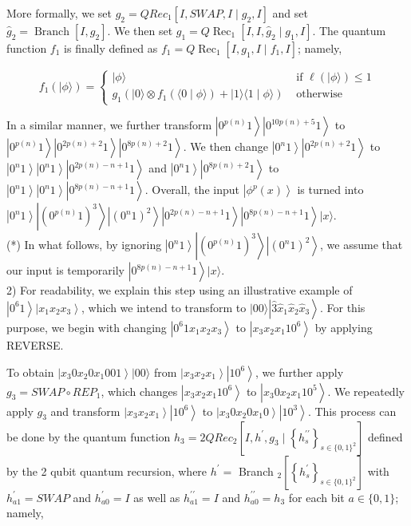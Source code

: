 \documentclass[10pt]{article}
\begin{document}
More formally, we set $g_{2}=Q R e c_{1}\left[I, S W A P, I \mid g_{2}, I\right]$ and set $\hat{g}_{2}=\operatorname{Branch}\left[I, g_{2}\right]$. We then set $g_{1}= Q \operatorname{Rec}_{1}\left[I, I, \hat{g}_{2} \mid g_{1}, I\right]$. The quantum function $f_{1}$ is finally defined as $f_{1}=Q \operatorname{Rec}_{1}\left[I, g_{1}, I \mid f_{1}, I\right]$; namely,

$$
f_{1}(|\phi\rangle)= \begin{cases}|\phi\rangle & \text { if } \ell(|\phi\rangle) \leq 1 \\ g_{1}\left(|0\rangle \otimes f_{1}(\langle 0 \mid \phi\rangle)+|1\rangle\langle 1 \mid \phi\rangle\right) & \text { otherwise }\end{cases}
$$

In a similar manner, we further transform $\left|0^{p(n)} 1\right\rangle\left|0^{10 p(n)+5} 1\right\rangle$ to $\left|0^{p(n)} 1\right\rangle\left|0^{2 p(n)+2} 1\right\rangle\left|0^{8 p(n)+2} 1\right\rangle$. We then change $\left|0^{n} 1\right\rangle\left|0^{2 p(n)+2} 1\right\rangle$ to $\left|0^{n} 1\right\rangle\left|0^{n} 1\right\rangle\left|0^{2 p(n)-n+1} 1\right\rangle$ and $\left|0^{n} 1\right\rangle\left|0^{8 p(n)+2} 1\right\rangle$ to $\left|0^{n} 1\right\rangle\left|0^{n} 1\right\rangle\left|0^{8 p(n)-n+1} 1\right\rangle$. Overall, the input $\left|\phi^{p}(x)\right\rangle$ is turned into $\left|0^{n} 1\right\rangle\left|\left(0^{p(n)} 1\right)^{3}\right\rangle\left|\left(0^{n} 1\right)^{2}\right\rangle\left|0^{2 p(n)-n+1} 1\right\rangle\left|0^{8 p(n)-n+1} 1\right\rangle|x\rangle$.\\
(*) In what follows, by ignoring $\left|0^{n} 1\right\rangle\left|\left(0^{p(n)} 1\right)^{3}\right\rangle\left|\left(0^{n} 1\right)^{2}\right\rangle$, we assume that our input is temporarily $\left|0^{8 p(n)-n+1} 1\right\rangle|x\rangle$.\\
2) For readability, we explain this step using an illustrative example of $\left|0^{6} 1\right\rangle\left|x_{1} x_{2} x_{3}\right\rangle$, which we intend to transform to $|00\rangle\left|\hat{3} \hat{x}_{1} \hat{x}_{2} \hat{x}_{3}\right\rangle$. For this purpose, we begin with changing $\left|0^{6} 1 x_{1} x_{2} x_{3}\right\rangle$ to $\left|x_{3} x_{2} x_{1} 10^{6}\right\rangle$ by applying REVERSE.

To obtain $\left|x_{3} 0 x_{2} 0 x_{1} 001\right\rangle|00\rangle$ from $\left|x_{3} x_{2} x_{1}\right\rangle\left|10^{6}\right\rangle$, we further apply $g_{3}=S W A P \circ R E P_{1}$, which changes $\left|x_{3} x_{2} x_{1} 10^{6}\right\rangle$ to $\left|x_{3} 0 x_{2} x_{1} 10^{5}\right\rangle$. We repeatedly apply $g_{3}$ and transform $\left|x_{3} x_{2} x_{1}\right\rangle\left|10^{6}\right\rangle$ to $\left|x_{3} 0 x_{2} 0 x_{1} 0\right\rangle\left|10^{3}\right\rangle$. This process can be done by the quantum function $h_{3}=2 Q R e c_{2}\left[I, h^{\prime}, g_{3} \mid\left\{h_{s}^{\prime \prime}\right\}_{s \in\{0,1\}^{2}}\right]$ defined by the 2 qubit quantum recursion, where $h^{\prime}=$ Branch $_{2}\left[\left\{h_{s}^{\prime}\right\}_{s \in\{0,1\}^{2}}\right]$ with $h_{a 1}^{\prime}=S W A P$ and $h_{a 0}^{\prime}=I$ as well as $h_{a 1}^{\prime \prime}=I$ and $h_{a 0}^{\prime \prime}=h_{3}$ for each bit $a \in\{0,1\}$; namely,
\end{document}

